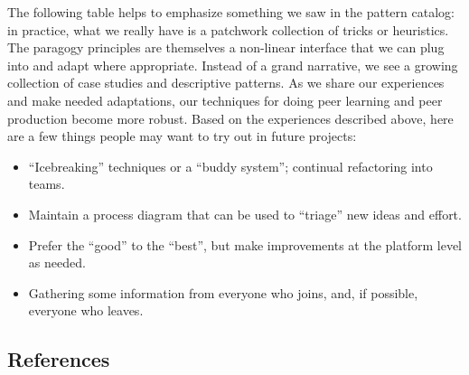 The following table helps to emphasize something we saw in the pattern
catalog: in practice, what we really have is a patchwork collection of
tricks or heuristics.  The paragogy principles are themselves a
non-linear interface that we can plug into and adapt where
appropriate.  Instead of a grand narrative, we see a growing
collection of case studies and descriptive patterns.  As we share our
experiences and make needed adaptations, our techniques for doing peer
learning and peer production become more robust. Based on the
experiences described above, here are a few things people may want to
try out in future projects:
\begin{itemize}
\item ``Icebreaking'' techniques or a ``buddy system''; continual
  refactoring into teams.
\item Maintain a process diagram that can be used to ``triage'' new ideas and effort.
\item Prefer the ``good'' to the ``best'', but make improvements at the platform level as needed.
\item Gathering some information from everyone who joins, and, if possible, everyone who leaves.
\end{itemize}



\subsection{References}

